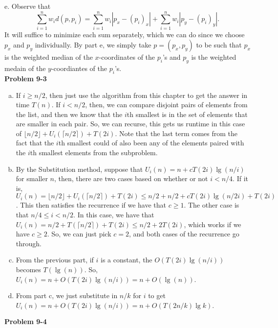 \documentclass{article}
\begin{document}
e. Observe that 
\[ \sum_{i=1}^n w_i d(p, p_i) = \sum_{i=1}^n w_i|p_x - (p_i)_x| + \sum_{i=1}^n w_i|p_y - (p_i)_y|.\]
It will suffice to minimize each sum separately, which we can do since we choose $p_x$ and $p_y$ individually.  By part e, we simply take $p = (p_x, p_y)$ to be such that $p_x$ is the weighted median of the $x$-coordinates of the $p_i$'s and $p_y$ is the weighted medain of the $y$-coordiantes of the $p_i$'s.\\


\noindent\textbf{ Problem 9-3} \\
\begin{enumerate}[a.]
\item
If $i\ge n/2$, then just use the algorithm from this chapter to get the answer in time $T(n)$. If $i<n/2$, then, we can compare disjoint pairs of elements from the list, and then we know that the $i$th smallest is in the set of elements that are smaller in each pair. So, we can recurse, this gets us runtime in this case of $\lfloor n/2 \rfloor + U_i(\lceil n/2 \rceil)+T(2i)$. Note that the last term comes from the fact that the $i$th smallest could of also been any of the elements paired with the $i$th smallest elements from the subproblem. 


\item
By the Substitution method, suppose that $U_i(n) = n+c T(2i)\lg(n/i)$ for smaller $n$, then, there are two cases based on whether or not $i <n/4$. If it is,  $U_i(n) = \lfloor n/2 \rfloor + U_i(\lceil n/2 \rceil) + T(2i) \le n/2 + n/2+cT(2i)\lg(n/2i) + T(2i)$. This then satisfies the recurrence if we have that $c \ge 1$. The other case is that $n/4 \le i < n/2$. In this case, we have that $U_i(n) = n/2 + T(\lceil n/2\rceil) + T(2i) \le n/2 + 2T(2i)$, which works if we have $c\ge 2$. So, we can just pick $c=2$, and both cases of the recurrence go through.


\item
From the previous part, if $i$ is a constant, the $O(T(2i)\lg(n/i))$ becomes $T(\lg(n))$. So, $U_i(n) = n+ O(T(2i)\lg(n/i)) = n + O(\lg(n))$.

\item
From part c, we just substitute in $n/k$ for $i$ to get $U_i(n) = n+ O(T(2i)\lg(n/i)) = n + O(T(2n/k) \lg k)$.



\end{enumerate}

\noindent\textbf{Problem 9-4}\\
\end{document}
